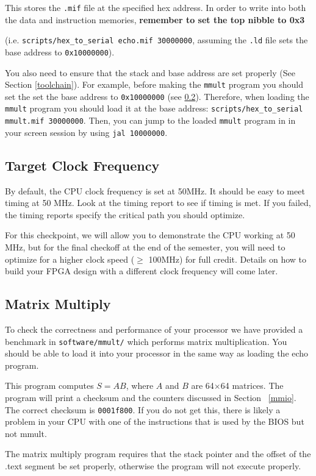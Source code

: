 \documentclass[11pt]{article}
\begin{document}
This stores the \verb|.mif| file at the specified hex address.
In order to write into both the data and instruction memories, \textbf{remember to set the top nibble to 0x3}

(i.e. \verb|scripts/hex_to_serial echo.mif 30000000|, assuming the \verb|.ld| file sets the base address to \verb|0x10000000|).

You also need to ensure that the stack and base address are set properly (See Section \ref{toolchain}).
For example, before making the \verb|mmult| program you should set the set the base address to \verb|0x10000000| (see \ref{mmult}).
Therefore, when loading the \verb|mmult| program you should load it at the base address: \verb|scripts/hex_to_serial mmult.mif 30000000|.
Then, you can jump to the loaded \verb|mmult| program in in your screen session by using \verb|jal 10000000|.

\subsection{Target Clock Frequency}
By default, the CPU clock frequency is set at 50MHz.
It should be easy to meet timing at 50 MHz.
Look at the timing report to see if timing is met.
If you failed, the timing reports specify the critical path you should optimize.

For this checkpoint, we will allow you to demonstrate the CPU working at 50 MHz, but for the final checkoff at the end of the semester, you will need to optimize for a higher clock speed ($\geq$ 100MHz) for full credit.
Details on how to build your FPGA design with a different clock frequency will come later.

\subsection{Matrix Multiply}
\label{mmult}
To check the correctness and performance of your processor we have provided a benchmark in \verb|software/mmult/| which performs matrix multiplication.
You should be able to load it into your processor in the same way as loading the echo program.

This program computes $S=AB$, where $A$ and $B$ are 64$\times$64 matrices.
The program will print a checksum and the counters discussed in Section ~\ref{mmio}.
The correct checksum is \verb|0001f800|.
If you do not get this, there is likely a problem in your CPU with one of the instructions that is used by the BIOS but not mmult.

The matrix multiply program requires that the stack pointer and the offset of the .text segment be set properly, otherwise the program will not execute properly.
\end{document}
